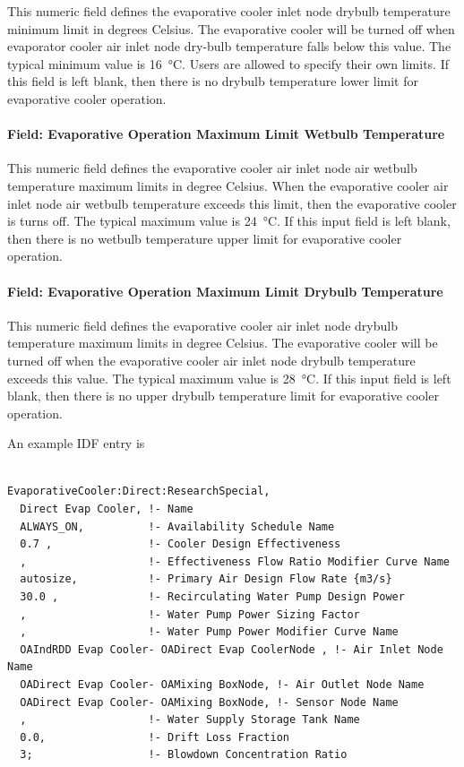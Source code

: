 This numeric field defines the evaporative cooler inlet node drybulb temperature minimum limit in degrees Celsius. The evaporative cooler will be turned off when evaporator cooler air inlet node dry-bulb temperature falls below this value. The typical minimum value is \SI{16}{\celsius}. Users are allowed to specify their own limits. If this field is left blank, then there is no drybulb temperature lower limit for evaporative cooler operation.

\paragraph{Field: Evaporative Operation Maximum Limit Wetbulb Temperature}\label{field-evaporative-operation-maximum-limit-wetbulb-temperature}

This numeric field defines the evaporative cooler air inlet node air wetbulb temperature maximum limits in degree Celsius. When the evaporative cooler air inlet node air wetbulb temperature exceeds this limit, then the evaporative cooler is turns off. The typical maximum value is \SI{24}{\celsius}. If this input field is left blank, then there is no wetbulb temperature upper limit for evaporative cooler operation.

\paragraph{Field: Evaporative Operation Maximum Limit Drybulb Temperature}\label{field-evaporative-operation-maximum-limit-drybulb-temperature}

This numeric field defines the evaporative cooler air inlet node drybulb temperature maximum limits in degree Celsius. The evaporative cooler will be turned off when the evaporative cooler air inlet node drybulb temperature exceeds this value. The typical maximum value is \SI{28}{\celsius}. If this input field is left blank, then there is no upper drybulb temperature limit for evaporative cooler operation.

An example IDF entry is

\begin{lstlisting}

EvaporativeCooler:Direct:ResearchSpecial,
  Direct Evap Cooler, !- Name
  ALWAYS_ON,          !- Availability Schedule Name
  0.7 ,               !- Cooler Design Effectiveness
  ,                   !- Effectiveness Flow Ratio Modifier Curve Name
  autosize,           !- Primary Air Design Flow Rate {m3/s}
  30.0 ,              !- Recirculating Water Pump Design Power
  ,                   !- Water Pump Power Sizing Factor
  ,                   !- Water Pump Power Modifier Curve Name
  OAIndRDD Evap Cooler- OADirect Evap CoolerNode , !- Air Inlet Node Name
  OADirect Evap Cooler- OAMixing BoxNode, !- Air Outlet Node Name
  OADirect Evap Cooler- OAMixing BoxNode, !- Sensor Node Name
  ,                   !- Water Supply Storage Tank Name
  0.0,                !- Drift Loss Fraction
  3;                  !- Blowdown Concentration Ratio
\end{lstlisting}

